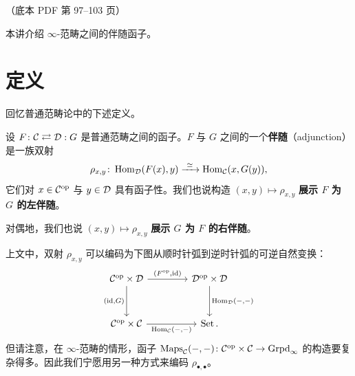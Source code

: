 \begin{center}\small\color{black!55}（底本 PDF 第 97–103 页）\end{center}

本讲介绍 $\infty$-范畴之间的伴随函子。

\section{定义}

\nitem\label{L12-1.1} 回忆普通范畴论中的下述定义。

\begin{definition}\label{L12-1.2}
设 $F\colon\mathcal{C}\rightleftarrows\mathcal{D}:G$ 是普通范畴之间的函子。$F$ 与 $G$ 之间的一个\textbf{伴随}（adjunction）是一族双射
\[
\rho_{x,y}\colon\Hom_{\cD}(F(x),y)\xrightarrow{\ \simeq\ }\Hom_{\cC}(x,G(y)),
\]
它们对 $x\in\mathcal{C}^{\mathrm{op}}$ 与 $y\in\mathcal{D}$ 具有函子性。我们也说构造 $(x,y)\mapsto\rho_{x,y}$ \textbf{展示 $F$ 为 $G$ 的左伴随}。
\end{definition}

\nitem\label{L12-1.3} 对偶地，我们也说 $(x,y)\mapsto\rho_{x,y}$ \textbf{展示 $G$ 为 $F$ 的右伴随}。

\nitem\label{L12-1.4} 上文中，双射 $\rho_{x,y}$ 可以编码为下图从顺时针弧到逆时针弧的可逆自然变换：
\[
\begin{tikzcd}[column sep=4.2em,row sep=3.2em]
\cC^{\op}\times\cD \arrow[r,"{(F^{\op},\id)}"] \arrow[d,"{(\id,G)}"'] & \cD^{\op}\times\cD \arrow[d,"{\Hom_{\cD}(-,-)}"] \\
\cC^{\op}\times\cC \arrow[r,"{\Hom_{\cC}(-,-)}"'] & \Set.
\end{tikzcd}
\]
但请注意，在 $\infty$-范畴的情形，函子 $\operatorname{Maps}_{\mathcal{C}}(-,-)\colon\mathcal{C}^{\mathrm{op}}\times\mathcal{C}\to\operatorname{Grpd}_{\infty}$ 的构造要复杂得多。因此我们宁愿用另一种方式来编码 $\rho_{\bullet,\bullet}$。

